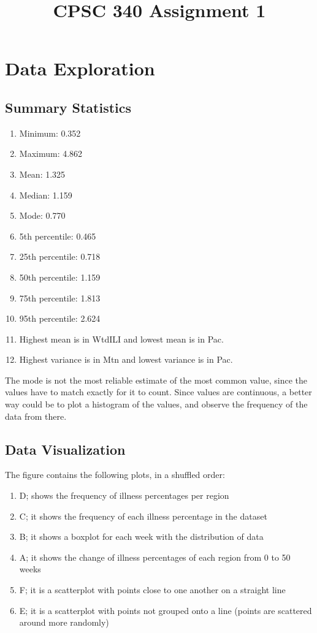 \documentclass{article}
\def\enum#1{\begin{enumerate}#1\end{enumerate}}
\begin{document}
\title{CPSC 340 Assignment 1}

\date{}
\maketitle

\vspace{-6em}

\section{Data Exploration}

\subsection{Summary Statistics}

\enum{
\item Minimum: 0.352
\item Maximum: 4.862
\item Mean: 1.325
\item Median: 1.159
\item Mode: 0.770
\item 5th percentile: 0.465
\item 25th percentile: 0.718
\item 50th percentile: 1.159
\item 75th percentile: 1.813
\item 95th percentile: 2.624
\item Highest mean is in WtdILI and lowest mean is in Pac.
\item Highest variance is in Mtn and lowest variance is in Pac.
}

The mode is not the most reliable estimate of the most common value, since the values have to match exactly for it to count. Since values are continuous, a better way could be to plot a histogram of the values, and observe the frequency of the data from there.



\subsection{Data Visualization}

The figure contains the following plots, in a shuffled order:
\enum{
\item D; shows the frequency of illness percentages per region
\item C; it shows the frequency of each illness percentage in the dataset
\item B; it shows a boxplot for each week with the distribution of data
\item A; it shows the change of illness percentages of each region from 0 to 50 weeks
\item F; it is a scatterplot with points close to one another on a straight line
\item E; it is a scatterplot with points not grouped onto a line (points are scattered around more randomly)
}
\end{document}
